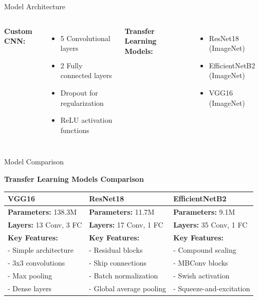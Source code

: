\documentclass{beamer}
\begin{document}
\begin{frame}{Model Architecture}
    \begin{columns}[T]
        \textbf{\textcolor{maincolor}{Custom CNN:}}
        \begin{itemize}
            \item 5 Convolutional layers
            \item 2 Fully connected layers
            \item Dropout for regularization
            \item ReLU activation functions
        \end{itemize}
        
        \textbf{\textcolor{maincolor}{Transfer Learning Models:}}
        \begin{itemize}
            \item ResNet18 (ImageNet)
            \item EfficientNetB2 (ImageNet)
            \item VGG16 (ImageNet)
        \end{itemize}
    \end{columns}
\end{frame}
\begin{frame}{Model Comparison}
    \begin{center}
        \textbf{\textcolor{maincolor}{Transfer Learning Models Comparison}}
    \end{center}
    \vspace{0.3cm}
    \begin{table}
        \small
        \begin{tabular}{|p{}|p{}|p{}|}
            \hline
            \textbf{\textcolor{maincolor}{VGG16}} & \textbf{\textcolor{maincolor}{ResNet18}} & \textbf{\textcolor{maincolor}{EfficientNetB2}} \\
            \hline
            \textbf{Parameters:} 138.3M & \textbf{Parameters:} 11.7M & \textbf{Parameters:} 9.1M \\
            \hline
            \textbf{Layers:} 13 Conv, 3 FC & \textbf{Layers:} 17 Conv, 1 FC & \textbf{Layers:} 35 Conv, 1 FC\\
            \hline
            \textbf{Key Features:} & \textbf{Key Features:} & \textbf{Key Features:} \\
            \scriptsize{- Simple architecture} & \scriptsize{- Residual blocks} & \scriptsize{- Compound scaling} \\
            \scriptsize{- 3x3 convolutions} & \scriptsize{- Skip connections} & \scriptsize{- MBConv blocks} \\
            \scriptsize{- Max pooling} & \scriptsize{- Batch normalization} & \scriptsize{- Swish activation}  \\
            \scriptsize{- Dense layers} & \scriptsize{- Global average pooling} & \scriptsize{- Squeeze-and-excitation}\\
            \hline
        \end{tabular}
    \end{table}
\end{frame}
\end{document}
